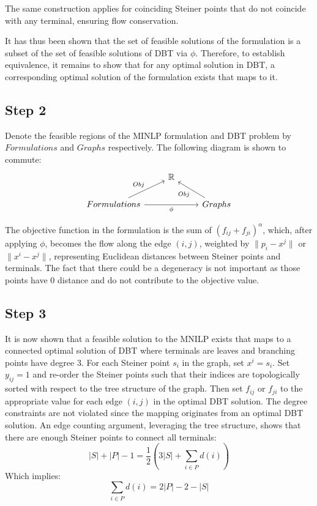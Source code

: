 \documentclass[12pt,a4paper]{article}
\numberwithin{equation}{section}
\theoremstyle{mytheorem}
\theoremstyle{myremark}
\theoremstyle{myparagraph}
\begin{document}
    The same construction applies for coinciding Steiner points that do not coincide with any terminal, ensuring flow conservation.

    It has thus been shown that the set of feasible solutions of the formulation is a subset of the set of feasible solutions of DBT via $\phi$.
    Therefore, to establish equivalence, it remains to show that for any optimal solution in DBT, a corresponding optimal solution of the formulation exists that maps to it.

    \subsection*{Step 2}
    Denote the feasible regions of the MINLP formulation and DBT problem by $Formulations$ and $Graphs$ respectively. 
    The following diagram is shown to commute:
    \[
        \begin{tikzcd}
            & \mathbb{R}  \\
            Formulations \arrow[ur, "Obj"] \arrow[rr, "\phi"'] & & Graphs  \arrow[ul, "Obj"]
        \end{tikzcd}
    \]

    The objective function in the formulation is the sum of $(f_{ij} + f_{ji})^\alpha$, which, after applying $\phi$, becomes the flow 
    along the edge $(i,j)$, weighted by $\| p_i - x^j \|$ or $\|x^i-x^j \|$, representing Euclidean distances between Steiner points and terminals.
    The fact that there could be a degeneracy is not important as those points have $0$ distance and do not contribute to the
    objective value.

    \subsection*{Step 3}

    It is now shown that a feasible solution to the MNILP exists that maps to a connected optimal solution of DBT where terminals are 
    leaves and branching points have degree 3.
    For each Steiner point $s_i$ in the graph, set $x^i = s_i$. Set $y_{ij} = 1$ and re-order the Steiner points 
    such that their indices are topologically sorted with respect to the tree structure of the graph.
    Then set $f_{ij}$ or $f_{ji}$ to the appropriate value for each edge $(i,j)$ in the optimal DBT solution.
    The degree constraints are not violated since the mapping originates from an optimal DBT solution.
    An edge counting argument, leveraging the tree structure, shows that there are enough Steiner points to connect all terminals:
    \begin{equation}
        |S| + |P| - 1 = \frac{1}{2} \left( 3|S| + \sum_{i \in P} d(i) \right)
    \end{equation}
    Which implies:
    \begin{equation}
        \label{eq:edge_counting}
        \sum_{i \in P} d(i) = 2|P| - 2 - |S|
    \end{equation}
\end{document}
